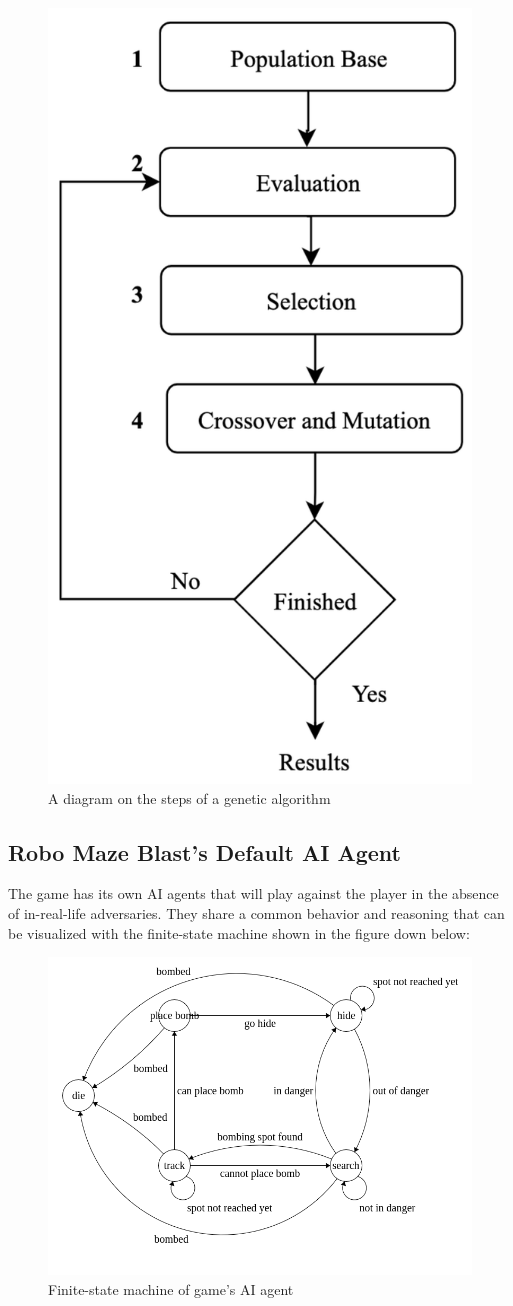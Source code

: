 \documentclass[sigconf]{acmart} %
\begin{document}
\begin{figure}
\centering
\includegraphics[width = 0.4\linewidth]{pictures/Steps-of-Genetic-Algorithms.png}
\caption{\label{fig:Steps-of-Genetic-Algorithm}A diagram on the steps of a genetic algorithm}
\end{figure}


\subsection{Robo Maze Blast's Default AI Agent}
The game has its own AI agents that will play against the player in the absence of in-real-life adversaries. They share a common behavior and reasoning that can be visualized with the finite-state machine shown in 
the figure down below:

\begin{figure}[H]
\includegraphics[width = 1\linewidth]{pictures/bomberman_finite_state_machine 1.png}
\caption{\label{fig:bomberman_finite_state_machine 1}Finite-state machine of game's AI agent}
\end{figure}
\end{document}
